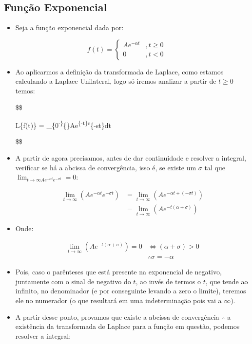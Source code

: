 \documentclass[]{article}
\providecommand{\tightlist}{%
  \setlength{\itemsep}{0pt}\setlength{\parskip}{0pt}}
\begin{document}
  \hypertarget{funuxe7uxe3o-exponencial}{%
  \subsection{Função Exponencial}\label{funuxe7uxe3o-exponencial}}

  \begin{itemize}
  \tightlist
  \item
    Seja a função exponencial dada por:
  \end{itemize}

  \[
  f(t) = \begin{cases}
  Ae^{-\alpha t} & , t\ge0 \\ 
  0 & , t<0
  \end{cases}
  \]

  \begin{itemize}
  \item
    Ao aplicarmos a definição da transformada de Laplace, como estamos
    calculando a Laplace Unilateral, logo só iremos analizar a partir de
    \(t\ge0\) temos:

    \$\$

    \mathcal L\{f(t)\} =
    \int\_\{0\textsuperscript{-\}}\{\infty\}Ae\textsuperscript{\{-\alpha t\}e}\{-st\}dt

    \$\$
  \item
    A partir de agora precisamos, antes de dar continuidade e resolver a
    integral, verificar se há a abcissa de convergência, isso é, se existe
    um \(\sigma\) tal que
    \(\lim_{t\rightarrow \infty Ae^{-\alpha t} e^{-\sigma t}} = 0\):

    \[
      \begin{aligned}
      \lim_{t\rightarrow\infty}\left(Ae^{-\alpha t} e^{-\sigma t}\right) &= \lim_{t\rightarrow\infty}\left(Ae^{-\alpha t +(-\sigma t)}\right)  \\ 
      &= \lim_{t\rightarrow\infty}\left(Ae^{-t (\alpha + \sigma)}\right)  
      \end{aligned}
      \]
  \item
    Onde:

    \[
      \begin{aligned}
      \lim_{t\rightarrow\infty}\left(Ae^{-t (\alpha + \sigma)}\right)    = 0&\iff (\alpha + \sigma) > 0 \\ &\therefore \sigma = -\alpha
      \end{aligned}
      \]
  \item
    Pois, caso o parênteses que está presente na exponencial de negativo,
    juntamente com o sinal de negativo do \(t\), ao invés de termos o
    \(t\), que tende ao infinito, no denominador (e por conseguinte
    levando a zero o limite), teremos ele no numerador (o que resultará em
    uma indeterminação pois vai a \(\infty\)).
  \item
    A partir desse ponto, provamos que existe a abcissa de convergência
    \(\therefore\) a existência da transformada de Laplace para a função
    em questão, podemos resolver a integral:


\end{itemize}
\end{document}
